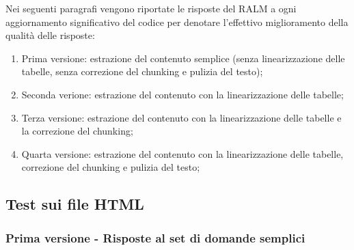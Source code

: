 Nei seguenti paragrafi vengono riportate le risposte del RALM a ogni aggiornamento significativo del codice per denotare l'effettivo miglioramento della qualità delle risposte:

\begin{enumerate}
    \item Prima versione: estrazione del contenuto semplice (senza linearizzazione delle tabelle, senza correzione del chunking e pulizia del testo);
    \item Seconda verione: estrazione del contenuto con la linearizzazione delle tabelle;
    \item Terza versione: estrazione del contenuto con la linearizzazione delle tabelle e la correzione del chunking;
    \item Quarta versione: estrazione del contenuto con la linearizzazione delle tabelle, correzione del chunking e pulizia del testo;

\end{enumerate}


\subsection{Test sui file HTML}

\subsubsection{Prima versione - Risposte al set di domande semplici}

